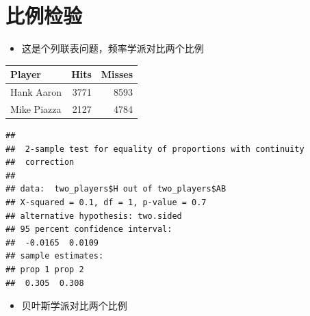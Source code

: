\documentclass[]{book}
\newenvironment{Shaded}{\begin{snugshade}}{\end{snugshade}}
\newcommand{\DataTypeTok}[1]{\textcolor[rgb]{0.13,0.29,0.53}{#1}}
\newcommand{\KeywordTok}[1]{\textcolor[rgb]{0.13,0.29,0.53}{\textbf{#1}}}
\newcommand{\NormalTok}[1]{#1}
\newcommand{\OperatorTok}[1]{\textcolor[rgb]{0.81,0.36,0.00}{\textbf{#1}}}
\newcommand{\StringTok}[1]{\textcolor[rgb]{0.31,0.60,0.02}{#1}}
\providecommand{\tightlist}{%
  \setlength{\itemsep}{0pt}\setlength{\parskip}{0pt}}
\begin{document}
\section{比例检验}

\begin{itemize}
\tightlist
\item
  这是个列联表问题，频率学派对比两个比例
\end{itemize}

\begin{Shaded}
\end{Shaded}

\begin{tabular}{l|r|r}
\hline
Player & Hits & Misses\\
\hline
Hank Aaron & 3771 & 8593\\
\hline
Mike Piazza & 2127 & 4784\\
\hline
\end{tabular}

\begin{Shaded}
\end{Shaded}

\begin{verbatim}
## 
##  2-sample test for equality of proportions with continuity
##  correction
## 
## data:  two_players$H out of two_players$AB
## X-squared = 0.1, df = 1, p-value = 0.7
## alternative hypothesis: two.sided
## 95 percent confidence interval:
##  -0.0165  0.0109
## sample estimates:
## prop 1 prop 2 
##  0.305  0.308
\end{verbatim}

\begin{itemize}
\tightlist
\item
  贝叶斯学派对比两个比例
\end{itemize}
\end{document}
